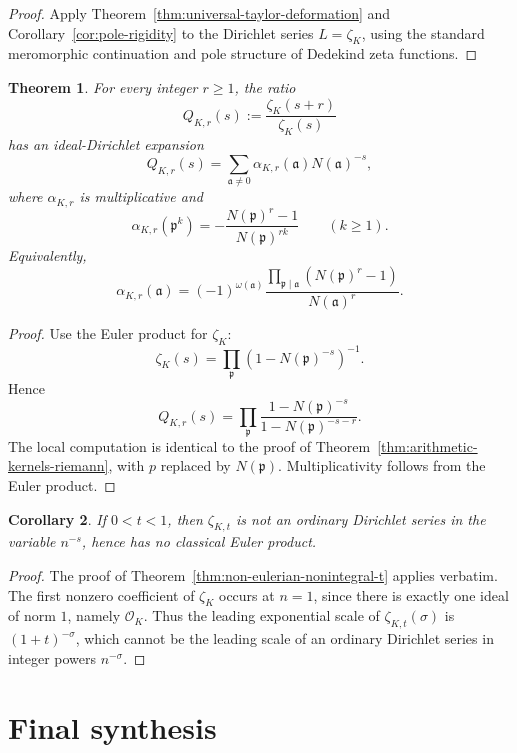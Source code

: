 \documentclass[11pt]{amsart}
\numberwithin{equation}{section}
\newtheorem{theorem}{Theorem}[section]
\newtheorem{corollary}[theorem]{Corollary}
\theoremstyle{definition}
\newcommand{\cO}{\mathcal O}
\begin{document}
\begin{proof}
Apply Theorem~\ref{thm:universal-taylor-deformation} and Corollary~\ref{cor:pole-rigidity} to the Dirichlet series $L=\zeta_K$, using the standard meromorphic continuation and pole structure of Dedekind zeta functions. 
\end{proof}

\begin{theorem}\label{thm:number-field-arithmetic-kernels}
For every integer $r\ge1$, the ratio
\[
Q_{K,r}(s):=\frac{\zeta_K(s+r)}{\zeta_K(s)}
\]
has an ideal-Dirichlet expansion
\[
Q_{K,r}(s)=\sum_{\mathfrak a\neq0}\alpha_{K,r}(\mathfrak a)N(\mathfrak a)^{-s},
\]
where $\alpha_{K,r}$ is multiplicative and
\[
\alpha_{K,r}(\mathfrak p^k)=-\frac{N(\mathfrak p)^r-1}{N(\mathfrak p)^{rk}}
\qquad(k\ge1).
\]
Equivalently,
\[
\boxed{
\alpha_{K,r}(\mathfrak a)=(-1)^{\omega(\mathfrak a)}
\frac{\prod_{\mathfrak p\mid \mathfrak a}(N(\mathfrak p)^r-1)}{N(\mathfrak a)^r}.
}
\]
\end{theorem}

\begin{proof}
Use the Euler product for $\zeta_K$:
\[
\zeta_K(s)=\prod_{\mathfrak p}(1-N(\mathfrak p)^{-s})^{-1}.
\]
Hence
\[
Q_{K,r}(s)=\prod_{\mathfrak p}\frac{1-N(\mathfrak p)^{-s}}{1-N(\mathfrak p)^{-s-r}}.
\]
The local computation is identical to the proof of Theorem~\ref{thm:arithmetic-kernels-riemann}, with $p$ replaced by $N(\mathfrak p)$. Multiplicativity follows from the Euler product. 
\end{proof}

\begin{corollary}\label{cor:number-field-non-eulerian}
If $0<t<1$, then $\zeta_{K,t}$ is not an ordinary Dirichlet series in the variable $n^{-s}$, hence has no classical Euler product.
\end{corollary}

\begin{proof}
The proof of Theorem~\ref{thm:non-eulerian-nonintegral-t} applies verbatim. The first nonzero coefficient of $\zeta_K$ occurs at $n=1$, since there is exactly one ideal of norm $1$, namely $\cO_K$. Thus the leading exponential scale of $\zeta_{K,t}(\sigma)$ is $(1+t)^{-\sigma}$, which cannot be the leading scale of an ordinary Dirichlet series in integer powers $n^{-\sigma}$. 
\end{proof}

\section{Final synthesis}
\end{document}
